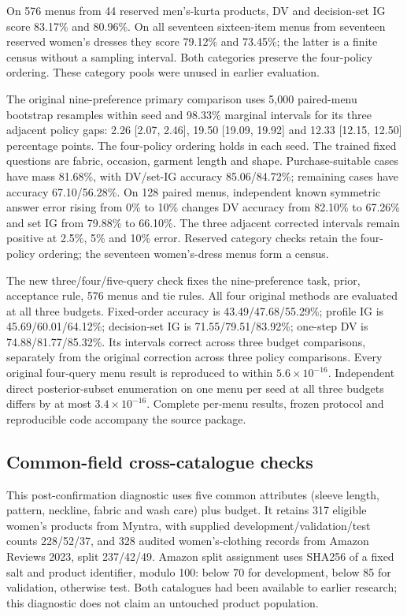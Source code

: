 \documentclass[sigconf,anonymous,review]{acmart}
\begin{document}
On 576 menus from 44 reserved men's-kurta products, DV and decision-set IG score 83.17\% and 80.96\%. On all seventeen sixteen-item menus from seventeen reserved women's dresses they score 79.12\% and 73.45\%; the latter is a finite census without a sampling interval. Both categories preserve the four-policy ordering. These category pools were unused in earlier evaluation.

The original nine-preference primary comparison uses 5,000 paired-menu bootstrap resamples within seed and 98.33\% marginal intervals for its three adjacent policy gaps: 2.26 [2.07, 2.46], 19.50 [19.09, 19.92] and 12.33 [12.15, 12.50] percentage points. The four-policy ordering holds in each seed. The trained fixed questions are fabric, occasion, garment length and shape. Purchase-suitable cases have mass 81.68\%, with DV/set-IG accuracy 85.06/84.72\%; remaining cases have accuracy 67.10/56.28\%. On 128 paired menus, independent known symmetric answer error rising from 0\% to 10\% changes DV accuracy from 82.10\% to 67.26\% and set IG from 79.88\% to 66.10\%. The three adjacent corrected intervals remain positive at 2.5\%, 5\% and 10\% error. Reserved category checks retain the four-policy ordering; the seventeen women's-dress menus form a census.

The new three/four/five-query check fixes the nine-preference task, prior, acceptance rule, 576 menus and tie rules. All four original methods are evaluated at all three budgets. Fixed-order accuracy is 43.49/47.68/55.29\%; profile IG is 45.69/60.01/64.12\%; decision-set IG is 71.55/79.51/83.92\%; one-step DV is 74.88/81.77/85.32\%. Its intervals correct across three budget comparisons, separately from the original correction across three policy comparisons. Every original four-query menu result is reproduced to within $5.6\times10^{-16}$. Independent direct posterior-subset enumeration on one menu per seed at all three budgets differs by at most $3.4\times10^{-16}$. Complete per-menu results, frozen protocol and reproducible code accompany the source package.

\subsection*{Common-field cross-catalogue checks}
This post-confirmation diagnostic uses five common attributes (sleeve length, pattern, neckline, fabric and wash care) plus budget. It retains 317 eligible women's products from Myntra, with supplied development/validation/test counts 228/52/37, and 328 audited women's-clothing records from Amazon Reviews 2023, split 237/42/49. Amazon split assignment uses SHA256 of a fixed salt and product identifier, modulo 100: below 70 for development, below 85 for validation, otherwise test. Both catalogues had been available to earlier research; this diagnostic does not claim an untouched product population.
\end{document}
